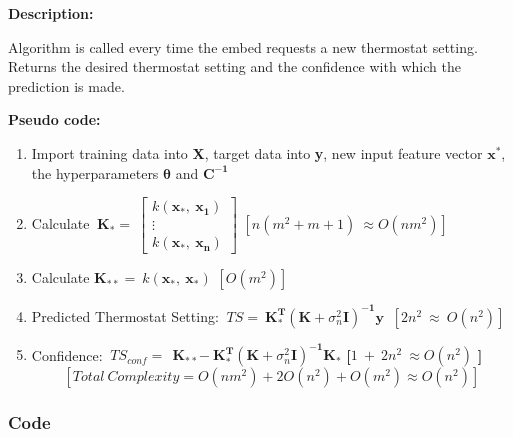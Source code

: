 \documentclass[10.5pt,a4paper,twoside]{report}   %
\begin{document}
\noindent \textbf{Description:}

\noindent Algorithm is called every time the embed requests a new thermostat setting. Returns the desired thermostat setting and the confidence with which the prediction is made.

\noindent \textbf{Pseudo code:}

\begin{enumerate}
\item \textbf{ }Import training data into \textbf{X}, target data into \textbf{y}, new input feature vector ${{\mathbf x}}^{{\mathbf *}}$,  the hyperparameters ${\mathbf \theta }$ and ${{\mathbf C}}^{{\mathbf -}{\mathbf 1}}$

\item  Calculate ${{\mathbf \ }{\mathbf K}}_{{\mathbf *}}=\ \left[ \begin{array}{c}
k\left({{\mathbf x}}_{{\mathbf *}},\ {{\mathbf x}}_{{\mathbf 1}}\right) \\ 
\vdots  \\ 
k\left({{\mathbf x}}_{{\mathbf *}},\ {{\mathbf x}}_{{\mathbf n}}\right) \end{array}
\right]$     $[n\left(m^2+m+1\right)\ \approx O\left({nm}^2\right)]$

\item  Calculate ${{\mathbf K}}_{{\mathbf **}}{\mathbf =\ }k\left({{\mathbf x}}_{{\mathbf *}},\ {{\mathbf x}}_{{\mathbf *}}\right)$     $[O\left(m^2\right)]$

\item  Predicted Thermostat Setting: $\ TS=\ {{\mathbf K}}^{{\mathbf T}}_{{\mathbf *}}{\left({\mathbf K}+{\sigma }^2_n{\mathbf I}\right)}^{{\mathbf -}{\mathbf 1}}{\mathbf y}\ $  $[2n^2\ \approx \ O(n^2)]$

\item  Confidence: $\ TS_{conf}=\ {{\mathbf \ }{\mathbf K}}_{{\mathbf **}}{\mathbf -}{\mathbf \ }{{\mathbf K}}^{{\mathbf T}}_{{\mathbf *}}{\left({\mathbf K}+{\sigma }^2_n{\mathbf I}\right)}^{{\mathbf -}{\mathbf 1}}{{\mathbf K}}_{{\mathbf *}}$\textbf{  [}$1\ +\ 2n^2\ \approx O(n^2)$\textbf{ ]}
\[[Total\ Complexity=O\left(nm^2\right)+2O\left(n^2\right)+O\left(m^2\right)\approx O\left(n^2\right)]\] 
\end{enumerate}
\subsubsection{Code}


\end{document}
